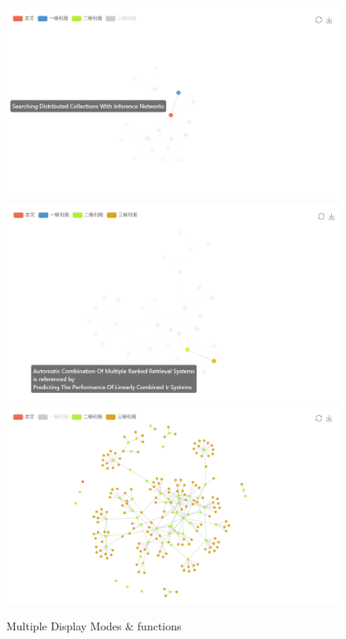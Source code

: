 \documentclass{book}
\begin{document}
\begin{figure}[htp]
\centering
\includegraphics[scale=0.3]{img/zlt_rel_demo1.png}
\includegraphics[scale=0.3]{img/zlt_rel_demo2.png}
\includegraphics[scale=0.3]{img/zlt_rel_demo3.png}
\caption{Multiple Display Modes \& functions}
\end{figure}
\end{document}
